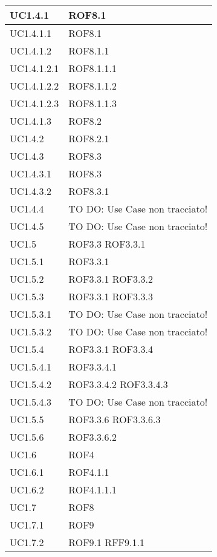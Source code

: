\begin{center}
\begin{longtable}{| p{4cm} | p{4cm} |}
\hline
UC1.4.1 & ROF8.1 \\
\hline
UC1.4.1.1 & ROF8.1 \\
\hline
UC1.4.1.2 & ROF8.1.1 \\
\hline
UC1.4.1.2.1 & ROF8.1.1.1 \\
\hline
UC1.4.1.2.2 & ROF8.1.1.2 \\
\hline
UC1.4.1.2.3 & ROF8.1.1.3 \\
\hline
UC1.4.1.3 & ROF8.2 \\
\hline
UC1.4.2 & ROF8.2.1 \\
\hline
UC1.4.3 & ROF8.3 \\
\hline
UC1.4.3.1 & ROF8.3 \\
\hline
UC1.4.3.2 & ROF8.3.1 \\
\hline
UC1.4.4 & TO DO: Use Case non tracciato! \\
\hline
UC1.4.5 & TO DO: Use Case non tracciato! \\
\hline
UC1.5 & ROF3.3 \newline ROF3.3.1 \\
\hline
UC1.5.1 & ROF3.3.1 \\
\hline
UC1.5.2 & ROF3.3.1 \newline ROF3.3.2 \\
\hline
UC1.5.3 & ROF3.3.1 \newline ROF3.3.3 \\
\hline
UC1.5.3.1 & TO DO: Use Case non tracciato! \\
\hline
UC1.5.3.2 & TO DO: Use Case non tracciato! \\
\hline
UC1.5.4 & ROF3.3.1 \newline ROF3.3.4 \\
\hline
UC1.5.4.1 & ROF3.3.4.1 \\
\hline
UC1.5.4.2 & ROF3.3.4.2 \newline ROF3.3.4.3 \\
\hline
UC1.5.4.3 & TO DO: Use Case non tracciato! \\
\hline
UC1.5.5 & ROF3.3.6 \newline ROF3.3.6.3 \\
\hline
UC1.5.6 & ROF3.3.6.2 \\
\hline
UC1.6 & ROF4 \\
\hline
UC1.6.1 & ROF4.1.1 \\
\hline
UC1.6.2 & ROF4.1.1.1 \\
\hline
UC1.7 & ROF8 \\
\hline
UC1.7.1 & ROF9 \\
\hline
UC1.7.2 & ROF9.1 \newline RFF9.1.1 \\

\end{longtable}
\end{center}
